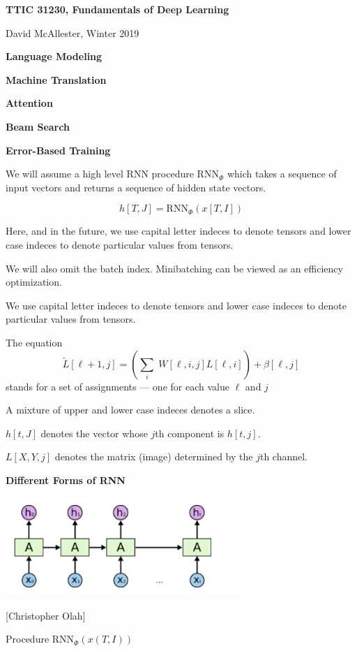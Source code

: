




{\Huge

  \centerline{\bf TTIC 31230, Fundamentals of Deep Learning}
  \bigskip
  \centerline{David McAllester, Winter 2019}
  \vfill
  \centerline{\bf Language Modeling}
  \vfill
  \centerline{\bf Machine Translation}
  \vfill
  \centerline{\bf Attention}
  \vfill
  \centerline{\bf Beam Search}
  \vfill
  \centerline{\bf Error-Based Training}


We will assume a high level RNN procedure $\mathrm{RNN}_\Phi$ which takes a sequence of input vectors and returns
a sequence of hidden state vectors.

\vfill
$$h[T,J] = \mathrm{RNN}_\Phi(x[T,I])$$

\vfill
Here, and in the future, we use capital letter indeces to denote tensors and lower case indeces to denote particular values from tensors.

\vfill
We will also omit the batch index.  Minibatching can be viewed as an efficiency optimization.


We use capital letter indeces to denote tensors and lower case indeces to denote particular values from tensors.

\vfill
The equation
$$\tilde{L}[\ell+1,j] = \left(\sum_i\;W[\ell,i,j]L[\ell,i]\right) + \beta[\ell,j]$$
stands for a set of assignments --- one for each value $\ell$ and $j$


A mixture of upper and lower case indeces denotes a slice.

\vfill
$h[t,J]$ denotes the vector whose $j$th component is $h[t,j]$.

\vfill
$L[X,Y,j]$ denotes the matrix (image) determined by the $j$th channel.

\slide{}


\centerline{\bf Different Forms of RNN}
\vfill
\vfill



\centerline{\includegraphics[width=3.5in]{../images/RNN}}
\centerline{{\large [Christopher Olah]}}
\vfill
Procedure $\mathrm{RNN}_\Phi(x(T,I))$

}
